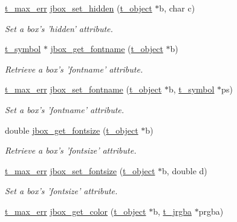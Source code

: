 \begin{DoxyCompactItemize}
\hyperlink{group__datatypes_ga73edaae82b318855cc09fac994918165}{t\_\-max\_\-err} \hyperlink{group__jbox_gaa83c5c91b5687838b4aa221236535b53}{jbox\_\-set\_\-hidden} (\hyperlink{structt__object}{t\_\-object} $\ast$b, char c)
\begin{DoxyCompactList}\small\item\em Set a box's 'hidden' attribute. \item\end{DoxyCompactList}\item 
\hyperlink{structt__symbol}{t\_\-symbol} $\ast$ \hyperlink{group__jbox_ga5a5801f294c0c6f8c5cefc686bffcdfb}{jbox\_\-get\_\-fontname} (\hyperlink{structt__object}{t\_\-object} $\ast$b)
\begin{DoxyCompactList}\small\item\em Retrieve a box's 'fontname' attribute. \item\end{DoxyCompactList}\item 
\hyperlink{group__datatypes_ga73edaae82b318855cc09fac994918165}{t\_\-max\_\-err} \hyperlink{group__jbox_gaa42077bec85957796b46eac319db0ad7}{jbox\_\-set\_\-fontname} (\hyperlink{structt__object}{t\_\-object} $\ast$b, \hyperlink{structt__symbol}{t\_\-symbol} $\ast$ps)
\begin{DoxyCompactList}\small\item\em Set a box's 'fontname' attribute. \item\end{DoxyCompactList}\item 
double \hyperlink{group__jbox_ga5ea741cbdbedbb94e93292fe9fdf4976}{jbox\_\-get\_\-fontsize} (\hyperlink{structt__object}{t\_\-object} $\ast$b)
\begin{DoxyCompactList}\small\item\em Retrieve a box's 'fontsize' attribute. \item\end{DoxyCompactList}\item 
\hyperlink{group__datatypes_ga73edaae82b318855cc09fac994918165}{t\_\-max\_\-err} \hyperlink{group__jbox_gae6342147186d369649574cb04b0b3deb}{jbox\_\-set\_\-fontsize} (\hyperlink{structt__object}{t\_\-object} $\ast$b, double d)
\begin{DoxyCompactList}\small\item\em Set a box's 'fontsize' attribute. \item\end{DoxyCompactList}\item 
\hyperlink{group__datatypes_ga73edaae82b318855cc09fac994918165}{t\_\-max\_\-err} \hyperlink{group__jbox_ga03c4056e731c28342a8ee17e5b86558f}{jbox\_\-get\_\-color} (\hyperlink{structt__object}{t\_\-object} $\ast$b, \hyperlink{structt__jrgba}{t\_\-jrgba} $\ast$prgba)

\end{DoxyCompactItemize}
